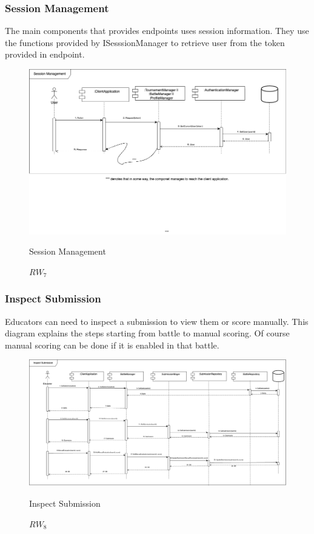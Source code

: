 \subsubsection{Session Management}
The main components that provides endpoints uses session information. They use the functions provided by ISesssionManager to retrieve user from the token provided in endpoint. 
\begin{figure}[H]
    \centering
    \includegraphics[width=\linewidth]{Images/runtime/session_runtime.drawio.png}
    \caption{$RW_{7}$} Session Management
\end{figure}


\subsubsection{Inspect Submission}
Educators can need to inspect a submission to view them or score manually.  This diagram explains the steps starting from battle to manual scoring. Of course manual scoring can be done if it is enabled in that battle.
\begin{figure}[H]
    \centering
    \includegraphics[width=\linewidth]{Images/runtime/inspect_submission_runtime.drawio.png}
    \caption{$RW_{8}$} Inspect Submission
\end{figure}


